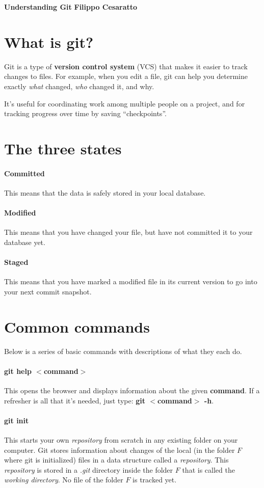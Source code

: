 \documentclass[a4paper, 11pt]{article}
\begin{document}
\noindent
\large\textbf{Understanding Git} \hfill \textbf{Filippo Cesaratto} \\
\normalsize

\section*{What is git?}
Git is a type of \textbf{version control system} (VCS) that makes it easier to track changes to files. For example, when you edit a file, git can help you determine exactly \emph{what} changed, \emph{who} changed it, and why.

It's useful for coordinating work among multiple people on a project, and for tracking progress over time by saving ``checkpoints''. 

\section*{The three states}
\paragraph{Committed} This means that the data is safely stored in your local database.
\paragraph{Modified} This means that you have changed your file, but have not committed it to your database yet.
\paragraph{Staged} This means that you have marked a modified file in its current version to go into your next commit snapshot.

\section*{Common commands}
Below is a series of basic commands with descriptions of what they each do.

\paragraph{git help $<$command$>$} This opens the browser and displays information about the given \textbf{command}. If a refresher is all that it's needed, just type: \textbf{git $<$command$>$ -h}.

\paragraph{git init}
This starts your own \emph{repository} from scratch in any existing folder on your computer. Git stores information about changes of the local (in the folder $F$ where git is initialized) files in a data structure called a \emph{repository}. This \emph{repository} is stored in a \emph{.git} directory inside the folder $F$ that is called the \emph{working directory}. No file of the folder $F$ is tracked yet.
\end{document}
